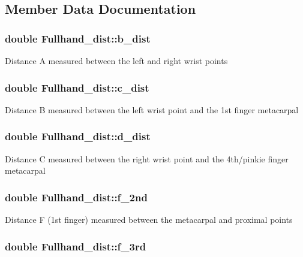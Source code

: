 \subsection{Member Data Documentation}
\hypertarget{classFullhand__dist_a84a320c58fe2712d7956b4e165deea85}{
\subsubsection[{b\_\-dist}]{\setlength{\rightskip}{0pt plus 5cm}double {\bf Fullhand\_\-dist::b\_\-dist}}}
\label{classFullhand__dist_a84a320c58fe2712d7956b4e165deea85}
Distance A measured between the left and right wrist points \hypertarget{classFullhand__dist_ac3b2b97d964c72201b1bf8b3b207e90c}{
\subsubsection[{c\_\-dist}]{\setlength{\rightskip}{0pt plus 5cm}double {\bf Fullhand\_\-dist::c\_\-dist}}}
\label{classFullhand__dist_ac3b2b97d964c72201b1bf8b3b207e90c}
Distance B measured between the left wrist point and the 1st finger metacarpal \hypertarget{classFullhand__dist_a90f722fb8e112d160589a601e3c4ba1b}{
\subsubsection[{d\_\-dist}]{\setlength{\rightskip}{0pt plus 5cm}double {\bf Fullhand\_\-dist::d\_\-dist}}}
\label{classFullhand__dist_a90f722fb8e112d160589a601e3c4ba1b}
Distance C measured between the right wrist point and the 4th/pinkie finger metacarpal \hypertarget{classFullhand__dist_a1fca8c119f92b6fc3fde608679163339}{
\subsubsection[{f\_\-2nd}]{\setlength{\rightskip}{0pt plus 5cm}double {\bf Fullhand\_\-dist::f\_\-2nd}}}
\label{classFullhand__dist_a1fca8c119f92b6fc3fde608679163339}
Distance F (1st finger) measured between the metacarpal and proximal points \hypertarget{classFullhand__dist_aa2e0806e52c7b02657dfc7a68e2e9d0d}{
\subsubsection[{f\_\-3rd}]{\setlength{\rightskip}{0pt plus 5cm}double {\bf Fullhand\_\-dist::f\_\-3rd}}}
